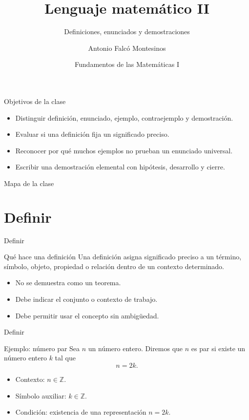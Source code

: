 \documentclass[aspectratio=169,11pt]{beamer}
\title[FdM I -- Clase 02]{Lenguaje matemático II}
\subtitle{Definiciones, enunciados y demostraciones}
\author{Antonio Falcó Montesinos}
\institute{Universidad CEU Cardenal Herrera}
\date{Fundamentos de las Matemáticas I}
\newcommand{\Z}{\mathbb{Z}}
\begin{document}
\begin{frame}
  \titlepage
\end{frame}

\begin{frame}{Objetivos de la clase}
\begin{itemize}
  \item Distinguir definición, enunciado, ejemplo, contraejemplo y demostración.
  \item Evaluar si una definición fija un significado preciso.
  \item Reconocer por qué muchos ejemplos no prueban un enunciado universal.
  \item Escribir una demostración elemental con hipótesis, desarrollo y cierre.
\end{itemize}
\end{frame}

\begin{frame}{Mapa de la clase}
\tableofcontents
\end{frame}

\section{Definir}

\begin{frame}{Definir}
\begin{block}{Qué hace una definición}
Una definición asigna significado preciso a un término, símbolo, objeto,
propiedad o relación dentro de un contexto determinado.
\end{block}

\begin{itemize}
  \item No se demuestra como un teorema.
  \item Debe indicar el conjunto o contexto de trabajo.
  \item Debe permitir usar el concepto sin ambigüedad.
\end{itemize}
\end{frame}

\begin{frame}{Definir}
\begin{block}{Ejemplo: número par}
Sea \(n\) un número entero. Diremos que \(n\) es par si existe un número entero
\(k\) tal que
\[
  n=2k.
\]
\end{block}

\begin{itemize}
  \item Contexto: \(n\in\Z\).
  \item Símbolo auxiliar: \(k\in\Z\).
  \item Condición: existencia de una representación \(n=2k\).
\end{itemize}
\end{frame}
\end{document}
